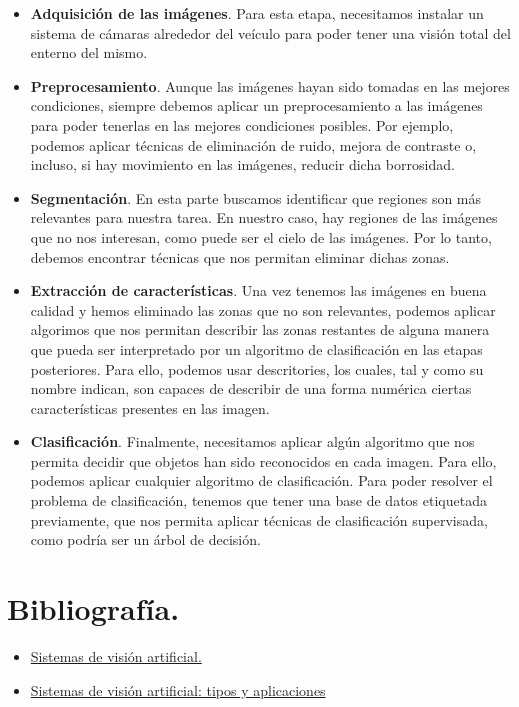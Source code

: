 \documentclass[12pt]{article}
\begin{document}
\begin{itemize}
	\item \textbf{Adquisición de las imágenes}. Para esta etapa, necesitamos instalar un sistema de cámaras alrededor del veículo para poder tener una visión total del enterno del mismo.
	\item \textbf{Preprocesamiento}. Aunque las imágenes hayan sido tomadas en las mejores condiciones, siempre debemos aplicar un preprocesamiento a las imágenes para poder tenerlas en las mejores condiciones posibles. Por ejemplo, podemos aplicar técnicas de eliminación de ruido, mejora de contraste o, incluso, si hay movimiento en las imágenes, reducir dicha borrosidad.
	\item \textbf{Segmentación}. En esta parte buscamos identificar que regiones son más relevantes para nuestra tarea. En nuestro caso, hay regiones de las imágenes que no nos interesan, como puede ser el cielo de las imágenes. Por lo tanto, debemos encontrar técnicas que nos permitan eliminar dichas zonas.
	\item \textbf{Extracción de características}. Una vez tenemos las imágenes en buena calidad y hemos eliminado las zonas que no son relevantes, podemos aplicar algorimos que nos permitan describir las zonas restantes de alguna manera que pueda ser interpretado por un algoritmo de clasificación en las etapas posteriores. Para ello, podemos usar descritories, los cuales, tal y como su nombre indican, son capaces de describir de una forma numérica ciertas características presentes en las imagen.
	
	\item \textbf{Clasificación}. Finalmente, necesitamos aplicar algún algoritmo que nos permita decidir que objetos han sido reconocidos en cada imagen. Para ello, podemos aplicar cualquier algoritmo de clasificación. Para poder resolver el problema de clasificación, tenemos que tener una base de datos etiquetada previamente, que nos permita aplicar técnicas de clasificación supervisada, como podría ser un árbol de decisión.
\end{itemize}

\section{Bibliografía.}

\begin{itemize}
	\item \href{http://www.crit.upc.edu/JCEE2011/pdf_ponencies/PDFs/17_11_11/Sistemas\%20de\%20Vision\%20Artificial.pdf}{Sistemas de visión artificial.}
	\item \href{https://blog.infaimon.com/sistemas-de-vision-artificial-tipos-aplicaciones/}{Sistemas de visión artificial: tipos y aplicaciones}
\end{itemize}
\end{document}
